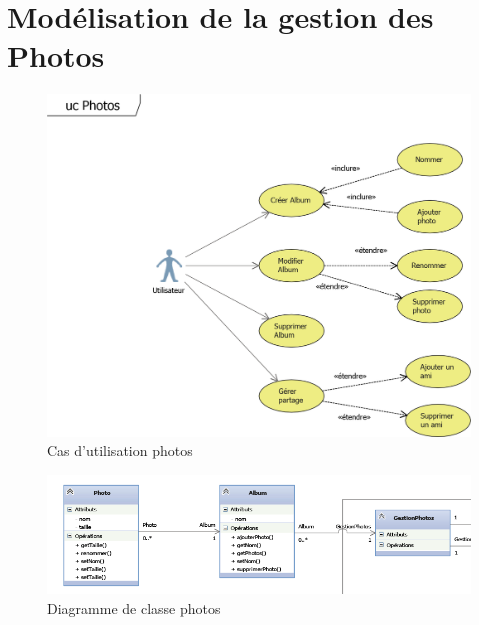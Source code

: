 \documentclass[11pt]{article}
\begin{document}
\newpage
\section{Modélisation de la gestion des Photos}
\begin{figure}[!h]
        \centering \includegraphics[scale=1]{ucPhotos.png}
        \caption{Cas d'utilisation photos}
         \label{fig:ucPhotos}
\end{figure}
\begin{figure}[!h]
        \centering \includegraphics[scale=1]{photo.png}
        \caption{Diagramme de classe photos}
         \label{fig:photos}
\end{figure}

\newpage
\end{document}
